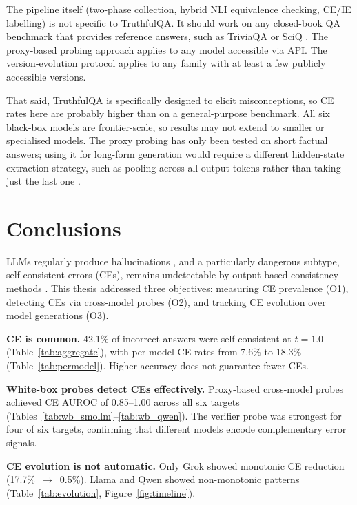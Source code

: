 \documentclass[12pt,twocolumn]{article}
\begin{document}
The pipeline itself (two-phase collection, hybrid NLI equivalence
checking, CE/IE labelling) is not specific to TruthfulQA. It should
work on any closed-book QA benchmark that provides reference answers,
such as TriviaQA or SciQ \citep{tan2025consistent}. The
proxy-based probing approach applies to any model accessible via
API. The version-evolution protocol applies to any family with at
least a few publicly accessible versions.

That said, TruthfulQA is specifically designed to elicit
misconceptions, so CE rates here are probably higher than on a
general-purpose benchmark. All six black-box models are
frontier-scale, so results may not extend to smaller or
specialised models. The proxy probing has only been tested on
short factual answers; using it for long-form generation would
require a different hidden-state extraction strategy, such as
pooling across all output tokens rather than taking just the last
one \citep{lin2022truthfulqa}.

\section{Conclusions}
\label{sec:conclusions}

LLMs regularly produce hallucinations \citep{ji2023hallucination},
and a particularly dangerous subtype, self-consistent errors (CEs),
remains undetectable by output-based consistency methods
\citep{tan2025consistent}. This thesis addressed three objectives:
measuring CE prevalence (O1), detecting CEs via cross-model probes
(O2), and tracking CE evolution over model generations (O3).

\textbf{CE is common.} 42.1\% of incorrect answers were
self-consistent at $t{=}1.0$ (Table~\ref{tab:aggregate}), with
per-model CE rates from 7.6\% to 18.3\%
(Table~\ref{tab:permodel}). Higher accuracy does not guarantee
fewer CEs.

\textbf{White-box probes detect CEs effectively.} Proxy-based
cross-model probes achieved CE AUROC of 0.85--1.00 across all six
targets (Tables~\ref{tab:wb_smollm}--\ref{tab:wb_qwen}). The
verifier probe was strongest for four of six targets, confirming
that different models encode complementary error signals.

\textbf{CE evolution is not automatic.} Only Grok showed monotonic
CE reduction (17.7\%~$\to$~0.5\%). Llama and Qwen showed
non-monotonic patterns (Table~\ref{tab:evolution},
Figure~\ref{fig:timeline}).
\end{document}
